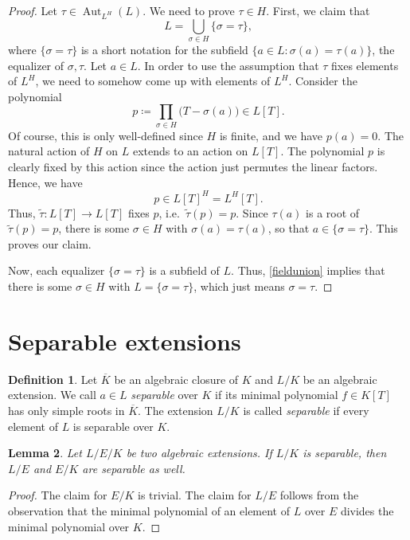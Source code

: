 \documentclass[11pt,reqno]{amsart}
\theoremstyle{standard}
\newtheorem{lemma}{Lemma}[section]
\theoremstyle{definition}
\newtheorem{defi}[lemma]{Definition}
\DeclareMathOperator{\Aut}{Aut}
\newcommand{\alg}[1]{\overline{#1}}
\begin{document}
\begin{proof}
Let $\tau \in \Aut_{L^H}(L)$. We need to prove $\tau \in H$. First, we claim that
\[L = \bigcup_{\sigma \in H} \{\sigma = \tau\},\]
where $\{\sigma = \tau\}$ is a short notation for the subfield $\{a \in L : \sigma(a) = \tau(a)\}$, the equalizer of $\sigma,\tau$. Let $a \in L$. In order to use the assumption that $\tau$ fixes elements of $L^H$, we need to somehow come up with elements of $L^H$. Consider the polynomial
\[p \coloneqq \prod_{\sigma \in H} \bigl(T - \sigma(a)\bigr) \in L[T].\]
Of course, this is only well-defined since $H$ is finite, and we have $p(a)=0$. The natural action of $H$ on $L$ extends to an action on $L[T]$. The polynomial $p$ is clearly fixed by this action since the action just permutes the linear factors. Hence, we have
\[p \in L[T]^H = L^H[T].\]
Thus, $\tilde{\tau} : L[T] \to L[T]$ fixes $p$, i.e.\ $\tilde{\tau}(p)=p$. Since $\tau(a)$ is a root of $\tilde{\tau}(p)=p$, there is some $\sigma \in H$ with $\sigma(a)=\tau(a)$, so that $a \in \{\sigma = \tau\}$. This proves our claim.

Now, each equalizer $\{\sigma = \tau\}$ is a subfield of $L$. Thus, \cref{fieldunion} implies that there is some $\sigma \in H$ with $L = \{\sigma = \tau\}$, which just means $\sigma = \tau$.
\end{proof}



\section{Separable extensions}

\begin{defi}
Let $\alg{K}$ be an algebraic closure of $K$ and $L/K$ be an algebraic extension. We call $a \in L$ \emph{separable} over $K$ if its minimal polynomial $f \in K[T]$ has only simple roots in $\alg{K}$. The extension $L/K$ is called \emph{separable} if every element of $L$ is separable over $K$.
\end{defi}

\begin{lemma} \label{sepsub}
Let $L/E/K$ be two algebraic extensions. If $L/K$ is separable, then $L/E$ and $E/K$ are separable as well.
\end{lemma}

\begin{proof}
The claim for $E/K$ is trivial. The claim for $L/E$ follows from the observation that the minimal polynomial of an element of $L$ over $E$ divides the minimal polynomial over $K$.
\end{proof}
\end{document}
